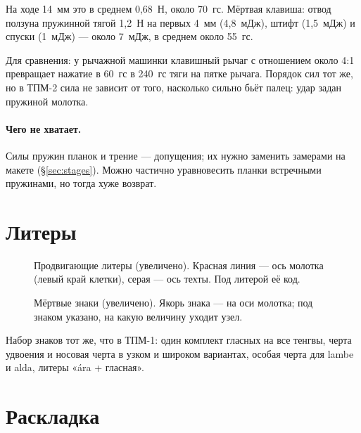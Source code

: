 На ходе 14~мм это в среднем 0,68~Н, около 70~гс. Мёртвая клавиша: отвод ползуна пружинной тягой 1,2~Н на первых 4~мм (4,8~мДж), штифт (1,5~мДж) и спуски (1~мДж) — около 7~мДж, в среднем около 55~гс.

Для сравнения: у рычажной машинки клавишный рычаг с отношением около 4:1 превращает нажатие в 60~гс в 240~гс тяги на пятке рычага. Порядок сил тот же, но в ТПМ-2 сила не зависит от того, насколько сильно бьёт палец: удар задан пружиной молотка.

\paragraph{Чего не хватает.} Силы пружин планок и трение — допущения; их нужно заменить замерами на макете (\S\ref{sec:stages}). Можно частично уравновесить планки встречными пружинами, но тогда хуже возврат.

\section{Литеры}

\begin{figure}[h]
\centering
\setlength\tgem{26mm}
\begin{tikzpicture}[x=\tgu,y=\tgu]

\end{tikzpicture}
\caption{Продвигающие литеры (увеличено). Красная линия — ось молотка (левый край клетки), серая — ось техты. Под литерой её код.}
\end{figure}

\begin{figure}[h]
\centering
\setlength\tgem{24mm}
\begin{tikzpicture}[x=\tgu,y=\tgu]

\end{tikzpicture}
\caption{Мёртвые знаки (увеличено). Якорь знака — на оси молотка; под знаком указано, на какую величину уходит узел.}
\end{figure}

Набор знаков тот же, что в ТПМ-1: один комплект гласных на все тенгвы, черта удвоения и носовая черта в узком и широком вариантах, особая черта для lambe и alda, литеры «ára + гласная».

\section{Раскладка}

